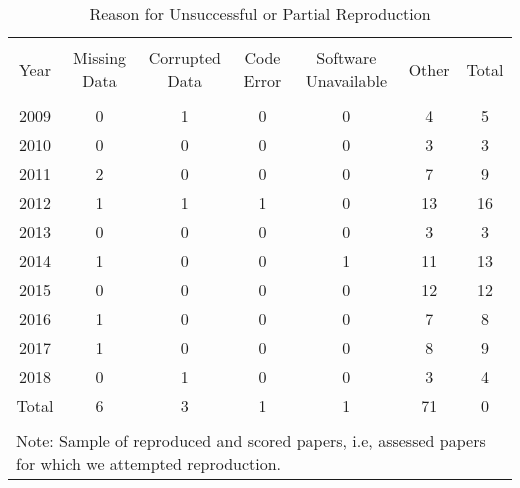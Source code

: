 
\begin{table}[!htbp] \centering 
  \caption{Reason for Unsuccessful or Partial Reproduction} 
  \label{tab:reason2} 
\footnotesize 
\begin{tabular}{@{\extracolsep{0.4pt}} ccccccc} 
\\[-1.8ex]\hline 
\hline \\[-1.8ex] 
Year & Missing Data & Corrupted Data & Code Error & Software Unavailable & Other & Total \\ 
\hline \\[-1.8ex] 
2009 & 0 & 1 & 0 & 0 & 4 & 5 \\ 
2010 & 0 & 0 & 0 & 0 & 3 & 3 \\ 
2011 & 2 & 0 & 0 & 0 & 7 & 9 \\ 
2012 & 1 & 1 & 1 & 0 & 13 & 16 \\ 
2013 & 0 & 0 & 0 & 0 & 3 & 3 \\ 
2014 & 1 & 0 & 0 & 1 & 11 & 13 \\ 
2015 & 0 & 0 & 0 & 0 & 12 & 12 \\ 
2016 & 1 & 0 & 0 & 0 & 7 & 8 \\ 
2017 & 1 & 0 & 0 & 0 & 8 & 9 \\ 
2018 & 0 & 1 & 0 & 0 & 3 & 4 \\ 
Total & 6 & 3 & 1 & 1 & 71 & 0 \\ 
\hline \\[-1.8ex] 
\multicolumn{7}{l}{Note: Sample of reproduced and scored papers, i.e, assessed papers for which we attempted reproduction.} \\ 
\end{tabular} 
\end{table} 
